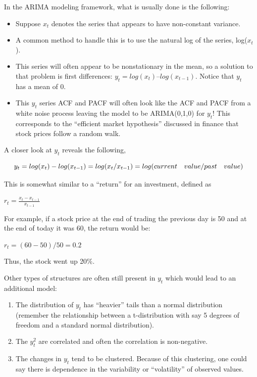 \documentclass[
]{book}
\providecommand{\tightlist}{%
  \setlength{\itemsep}{0pt}\setlength{\parskip}{0pt}}
\theoremstyle{definition}
\theoremstyle{definition}
\theoremstyle{definition}
\theoremstyle{definition}
\theoremstyle{remark}
\begin{document}
In the ARIMA modeling framework, what is usually done is the following:

\begin{itemize}
\tightlist
\item
  Suppose \(x_t\) denotes the series that appears to have non-constant variance.\\
\item
  A common method to handle this is to use the natural log of the series, log(\(x_t\)).\\
\item
  This series will often appear to be nonstationary in the mean, so a solution to that problem is first differences: \(y_t = log(x_t) – log(x_{t-1})\). Notice that \(y_t\) has a mean of 0.\\
\item
  This \(y_t\) series ACF and PACF will often look like the ACF and PACF from a white noise process leaving the model to be ARIMA(0,1,0) for \(y_t\)! This corresponds to the ``efficient market hypothesis'' discussed in finance that stock prices follow a random walk.
\end{itemize}

A closer look at \(y_t\) reveals the following,

\[y_t=log(x_t)-log(x_{t-1})\\=log(x_t/x_{t-1})\\=log(current \quad value/ past \quad value)\]

This is somewhat similar to a ``return'' for an investment, defined as

\(r_t=\frac{x_t-x_{t-1}}{x_{t-1}}\)

For example, if a stock price at the end of trading the previous day is 50 and at the end of today it was 60, the return would be:

\(r_t=(60-50)/50=0.2\)

Thus, the stock went up 20\%.

Other types of structures are often still present in \(y_t\) which would lead to an additional model:

\begin{enumerate}
\def\labelenumi{\arabic{enumi}.}
\tightlist
\item
  The distribution of \(y_t\) has ``heavier'' tails than a normal distribution (remember the relationship between a t-distribution with say 5 degrees of freedom and a standard normal distribution).\\
\item
  The \(y_t^2\) are correlated and often the correlation is non-negative.\\
\item
  The changes in \(y_t\) tend to be clustered. Because of this clustering, one could say there is dependence in the variability or ``volatility'' of observed values.
\end{enumerate}
\end{document}

